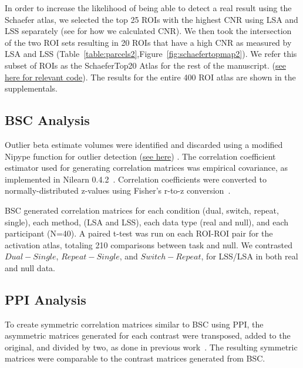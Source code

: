 \documentclass[phd,figures,tables,ackpage,abstractpage,publicabstractpage]{uithesis}
\begin{document}
In order to increase the likelihood of being able to detect a real result using the Schaefer atlas,
we selected the top 25 ROIs with the highest CNR using LSA and LSS separately
(see  for how we calculated CNR).
We then took the intersection of the two ROI sets resulting in 20 ROIs that have a high CNR
as measured by LSA and LSS (Table~\ref{table:parcels2},Figure~\ref{fig:schaefertopmap2}).
We refer this subset of ROIs as the SchaeferTop20 Atlas for the rest of the manuscript.
(\href{https://github.com/jdkent/BetaSeriesRealDataAnalysis/blob/b18b44321edf7b662a1e5ea635f64452c8d3644c/nibsAnalysis/cnr_trial_variability.ipynb}{see here for relevant code}).
The results for the entire 400 ROI atlas are shown in the supplementals.

\subsection{BSC Analysis}

Outlier beta estimate volumes were identified and discarded using a
modified Nipype function for outlier detection
(\href{https://github.com/HBClab/NiBetaSeries/blob/a45c0a1f/src/nibetaseries/interfaces/nilearn.py#L153}{see here}) \cite{Crosby1994}.
The correlation coefficient estimator used for generating correlation matrices
was empirical covariance, as implemented in Nilearn 0.4.2~\cite{Abraham2014}.
Correlation coefficients were converted to normally-distributed z-values using
Fisher's r-to-z conversion~\cite{Fisher1915}.

BSC generated correlation matrices for each condition (dual, switch, repeat, single),
each method, (LSA and LSS), each data type (real and null), and each participant (N=40).
A paired t-test was run on each ROI-ROI pair for the activation atlas, totaling 210 comparisons
between task and null.
We contrasted $Dual - Single$, $Repeat - Single$, and $Switch - Repeat$, for LSS/LSA in both
real and null data.

\subsection{PPI Analysis}

To create symmetric correlation matrices similar to BSC using PPI, the asymmetric matrices generated for
each contrast were transposed, added to the original, and divided by two, as done in previous work~\cite{Di2019a}.
The resulting symmetric matrices were comparable to the contrast matrices generated from BSC.
\end{document}
